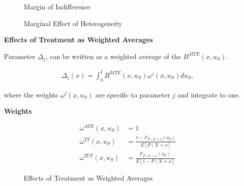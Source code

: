 \begin{frame}
\begin{figure}\caption{Margin of Indifference}
\end{figure}
\end{frame}


\begin{frame}

\begin{figure}\caption{Marginal Effect of Heterogeneity}
\end{figure}

\end{frame}


\begin{frame}
\textbf{Effects of Treatment as Weighted Averages}

Parameter \(\Delta_j\), can be written as a weighted average of the
\(B^{MTE}(x, u_S)\).

\begin{align*}
\Delta_j(x) = \int_0^1 B^{MTE}(x, u_S) \omega^j(x, u_S) du_S,
\end{align*}

where the weights \(\omega^j(x, u_S)\) are specific to parameter \(j\)
and integrate to one.
\end{frame}

\begin{frame}
\textbf{Weights}

\begin{align*}
 \omega^{ATE}(x, u_S) & = 1 \\
 \omega^{TT}(x, u_S) & = \frac{1 - F_{P\mid X=x}(u_S)}{E[P \mid X = x]}\\
 \omega^{TUT}(x, u_S) & = \frac{F_{P\mid X=x}(u_S)}{E[1 - P \mid X = x]}
\end{align*}

\end{frame}


\begin{frame}
\begin{figure}\caption{Effects of Treatment as Weighted Averages}
\end{figure}
\end{frame}


